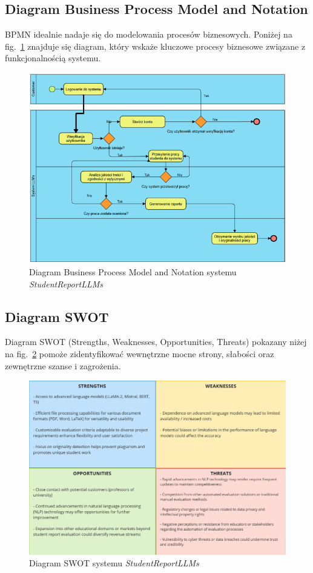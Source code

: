 \documentclass[a4paper, 12pt]{article}
\begin{document}
\subsection{Diagram Business Process Model and Notation}
BPMN idealnie nadaje się do modelowania procesów biznesowych.
Poniżej na fig.~\ref{fig:BPMN} znajduje się diagram, który wskaże kluczowe procesy biznesowe związane z funkcjonalnością systemu.

\begin{figure}[H]
    \centering
    \includegraphics[width=\textwidth]{img/BPMN}
    \caption{Diagram Business Process Model and Notation systemu \textit{StudentReportLLMs}}
    \label{fig:BPMN}
\end{figure}

\subsection{Diagram SWOT}
Diagram SWOT (Strengths, Weaknesses, Opportunities, Threats) pokazany niżej na fig.~\ref{fig:swot} pomoże zidentyfikować wewnętrzne mocne strony, słabości oraz zewnętrzne szanse i zagrożenia.

\begin{figure}[H]
    \centering
    \includegraphics[width=\textwidth]{img/swot}
    \caption{Diagram SWOT systemu \textit{StudentReportLLMs}}
    \label{fig:swot}
\end{figure}
\end{document}
